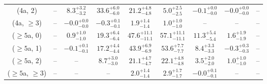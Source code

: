 \begin{table}[h!]
{\begin{tabular}{ccccccccc}
	(4a, 2) & -- & $8.3^{+ 3.2 }_{- 3.2 }$ & $33.6^{+ 6.0 }_{- 6.0 }$ & $21.2^{+ 4.8 }_{- 4.8 }$ & $5.0^{+ 2.5 }_{- 2.5 }$ & $-0.1^{+ 0.0 }_{- 0.0 }$ & $-0.0^{+ 0.0 }_{- 0.0 }$ & -- \\[0.5ex] 
	(4a, $\ge3$) & -- & $-0.0^{+ 0.0 }_{- 0.0 }$ & $-0.3^{+ 0.1 }_{- 0.1 }$ & $1.9^{+ 1.4 }_{- 1.4 }$ & $1.0^{+ 1.0 }_{- 1.0 }$ & -- & -- & -- \\[0.5ex] 
	($\ge5$a, 0) & -- & $0.9^{+ 1.0 }_{- 1.0 }$ & $19.3^{+ 6.4 }_{- 6.4 }$ & $47.6^{+ 11.1 }_{- 11.1 }$ & $57.1^{+ 11.1 }_{- 11.1 }$ & $11.3^{+ 5.4 }_{- 5.4 }$ & $1.6^{+ 1.9 }_{- 1.9 }$ & -- \\[0.5ex] 
	($\ge5$a, 1) & -- & $-0.1^{+ 0.1 }_{- 0.1 }$ & $17.2^{+ 4.4 }_{- 4.4 }$ & $43.9^{+ 6.9 }_{- 6.9 }$ & $53.6^{+ 7.7 }_{- 7.7 }$ & $8.4^{+ 3.3 }_{- 3.3 }$ & $-0.3^{+ 0.3 }_{- 0.3 }$ & -- \\[0.5ex] 
	($\ge5$a, 2) & -- & -- & $8.7^{+ 3.0 }_{- 3.0 }$ & $21.1^{+ 4.7 }_{- 4.7 }$ & $22.1^{+ 4.8 }_{- 4.8 }$ & $3.5^{+ 2.0 }_{- 2.0 }$ & $1.0^{+ 1.0 }_{- 1.0 }$ & -- \\[0.5ex] 
	($\ge5$a, $\ge3$) & -- & -- & -- & $2.0^{+ 1.4 }_{- 1.4 }$ & $2.9^{+ 1.7 }_{- 1.7 }$ & $-0.0^{+ 0.1 }_{- 0.1 }$ & -- & -- \\[0.5ex] 
	\hline
	\hline
\end{tabular}}
\end{table}
